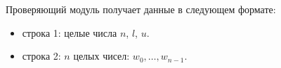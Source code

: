 Проверяющий модуль получает данные в следующем формате:

\begin{itemize}
\item строка 1: целые числа $n$, $l$, $u$. 
\item строка 2: $n$ целых чисел: $w_0, \ldots , w_{n - 1}$.
\end{itemize}
